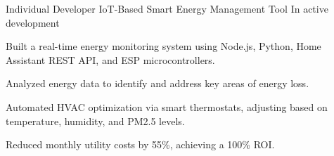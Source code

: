 

\begin{cventries}

  \cventry
    {Individual Developer} %
    {IoT-Based Smart Energy Management Tool} %
    {} %
    {In active development} %
    {
      \begin{cvitems} %
        \item {Built a real-time energy monitoring system using Node.js, Python, Home Assistant REST API, and ESP microcontrollers.}
        \item {Analyzed energy data to identify and address key areas of energy loss.}
        \item {Automated HVAC optimization via smart thermostats, adjusting based on temperature, humidity, and PM2.5 levels.}
        \item {Reduced monthly utility costs by 55\%, achieving a 100\% ROI.}
      \end{cvitems}
    }
\end{cventries}
